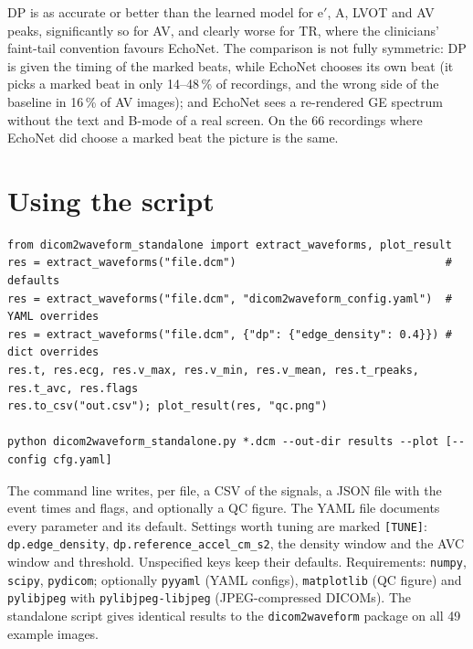 \documentclass[10pt,a4paper]{article}
\newcommand{\code}[1]{\texttt{\small #1}}
\begin{document}
DP is as accurate or better than the learned model for e$'$, A, LVOT and AV peaks, significantly so for AV, and clearly worse for TR, where
the clinicians' faint-tail convention favours EchoNet. The comparison is not fully symmetric: DP is given the timing of the marked beats,
while EchoNet chooses its own beat (it picks a marked beat in only 14--48\,\% of recordings, and the wrong side of the baseline in 16\,\% of
AV images); and EchoNet sees a re-rendered GE spectrum without the text and B-mode of a real screen. On the 66 recordings where EchoNet did
choose a marked beat the picture is the same.

\section{Using the script}
\begin{verbatim}
from dicom2waveform_standalone import extract_waveforms, plot_result
res = extract_waveforms("file.dcm")                                # defaults
res = extract_waveforms("file.dcm", "dicom2waveform_config.yaml")  # YAML overrides
res = extract_waveforms("file.dcm", {"dp": {"edge_density": 0.4}}) # dict overrides
res.t, res.ecg, res.v_max, res.v_min, res.v_mean, res.t_rpeaks, res.t_avc, res.flags
res.to_csv("out.csv"); plot_result(res, "qc.png")

python dicom2waveform_standalone.py *.dcm --out-dir results --plot [--config cfg.yaml]
\end{verbatim}
The command line writes, per file, a CSV of the signals, a JSON file with the event times and flags, and optionally a QC figure.
The YAML file documents every parameter and its default. Settings worth tuning are marked \code{[TUNE]}: \code{dp.edge\_density},
\code{dp.reference\_accel\_cm\_s2}, the density window and the AVC window and threshold. Unspecified keys keep
their defaults. Requirements: \code{numpy}, \code{scipy}, \code{pydicom}; optionally \code{pyyaml} (YAML configs), \code{matplotlib}
(QC figure) and \code{pylibjpeg} with \code{pylibjpeg-libjpeg} (JPEG-compressed DICOMs). The standalone script gives identical results to the
\code{dicom2waveform} package on all 49 example images.
\end{document}
